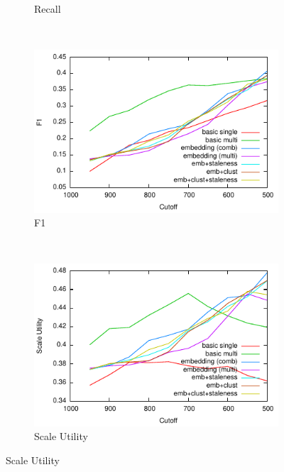 \documentclass{article}
\begin{document}
{{\begin{figure}[tb]
\begin{subfigure}[b]{\officialRunWidth}
			\caption{Recall}
			\label{official:prec}
    \end{subfigure}
    ~
    \begin{subfigure}[b]{\officialRunWidth}
            \includegraphics[width=\textwidth]{fig/official/official-f1}
			\caption{F1}
			\label{official:prec}
    \end{subfigure}
    ~
    \begin{subfigure}[b]{\officialRunWidth}
            \includegraphics[width=\textwidth]{fig/official/official-su}
			\caption{Scale Utility}
			\label{official:prec}
    \end{subfigure}

\end{figure}}}
\end{document}
